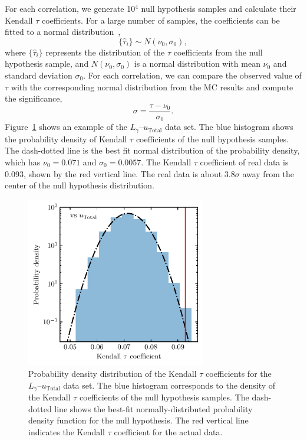 \documentclass[doublespace,nopageskip]{VTthesis} %
\begin{document}
For each correlation, we generate 10$^4$ null hypothesis samples and calculate their Kendall $\tau$ coefficients. For a large number of samples, the coefficients can be fitted to a normal distribution~\citep{10.2307/2669997},
\begin{equation}
    \{\hat{\tau}_i\} \sim N(\nu_0,\sigma_0),
\end{equation}
where $\{\hat{\tau}_i\}$ represents the distribution of the $\tau$ coefficients from the null hypothesis sample, and $N(\nu_0,\sigma_0)$ is a normal distribution with mean $\nu_0$ and standard deviation $\sigma_0$. For each correlation, we can compare the observed value of $\tau$ with the corresponding normal distribution from the MC results and compute the significance,
\begin{equation}
    \sigma = \frac{\tau - \nu_0}{\sigma_0}.
\end{equation}
Figure~\ref{fig:hist} shows an example of the $L_\gamma$--$u_\mathrm{Total}$ data set. The blue histogram shows the probability density of Kendall $\tau$ coefficients of the null hypothesis samples. The dash-dotted line is the best fit normal distribution of the probability density, which has $\nu_0 = 0.071$ and $\sigma_0 = 0.0057$. The Kendall $\tau$ coefficient of real data is 0.093, shown by the red vertical line. The real data is about 3.8$\sigma$ away from the center of the null hypothesis distribution.

\begin{figure}[htb]
    \centering
    \includegraphics[width=0.7\textwidth]{Figures/Globular/hist_urad.pdf}
    \caption{ Probability density distribution of the Kendall $\tau$ coefficients for the $L_\gamma$--$u_\mathrm{Total}$ data set. The blue histogram %
    corresponds to the density of the Kendall $\tau$ coefficients of the null hypothesis samples. The dash-dotted line shows the best-fit normally-distributed probability density function for the null hypothesis. The red vertical line indicates the Kendall $\tau$ coefficient for the %
    actual data.}
    \label{fig:hist}
\end{figure}
\end{document}
